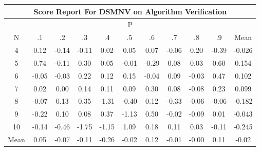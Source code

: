 \documentclass[11pt,a4paper]{report}
\begin{document}
\begin{longtable}{ | c || c | c | c | c | c | c | c | c | c || c |}
\hline
\multicolumn{11}{|c|}{ Score Report For DSMNV on Algorithm Verification} \\
\hline
\multicolumn{11}{|c|}{ P } \\
\hline
N & .1 & .2 & .3 & .4 & .5 & .6 & .7 & .8 & .9 & Mean\\
 \hline
 \hline
 \endhead
  4 &  \cellcolor[HTML]{FFFFFF} 0.12 &  \cellcolor[HTML]{FFFFFF} -0.14 &  \cellcolor[HTML]{FFFFFF} -0.11 &  \cellcolor[HTML]{FFFFFF} 0.02 &  \cellcolor[HTML]{FFFFFF} 0.05 &  \cellcolor[HTML]{FFFFFF} 0.07 &  \cellcolor[HTML]{FFFFFF} -0.06 &  \cellcolor[HTML]{F7F7FF} 0.20 &  \cellcolor[HTML]{FFF7F7} -0.39 & -0.026 \\
  5 &  \cellcolor[HTML]{EFEFFF} 0.74 &  \cellcolor[HTML]{FFFFFF} -0.11 &  \cellcolor[HTML]{F7F7FF} 0.30 &  \cellcolor[HTML]{FFFFFF} 0.05 &  \cellcolor[HTML]{FFFFFF} -0.01 &  \cellcolor[HTML]{FFF7F7} -0.29 &  \cellcolor[HTML]{FFFFFF} 0.08 &  \cellcolor[HTML]{FFFFFF} 0.03 &  \cellcolor[HTML]{EFEFFF} 0.60 & 0.154 \\
  6 &  \cellcolor[HTML]{FFFFFF} -0.05 &  \cellcolor[HTML]{FFFFFF} -0.03 &  \cellcolor[HTML]{F7F7FF} 0.22 &  \cellcolor[HTML]{FFFFFF} 0.12 &  \cellcolor[HTML]{FFFFFF} 0.15 &  \cellcolor[HTML]{FFFFFF} -0.04 &  \cellcolor[HTML]{FFFFFF} 0.09 &  \cellcolor[HTML]{FFFFFF} -0.03 &  \cellcolor[HTML]{F7F7FF} 0.47 & 0.102 \\
  7 &  \cellcolor[HTML]{FFFFFF} 0.02 &  \cellcolor[HTML]{FFFFFF} 0.00 &  \cellcolor[HTML]{FFFFFF} 0.14 &  \cellcolor[HTML]{FFFFFF} 0.11 &  \cellcolor[HTML]{FFFFFF} 0.09 &  \cellcolor[HTML]{F7F7FF} 0.30 &  \cellcolor[HTML]{FFFFFF} 0.08 &  \cellcolor[HTML]{FFFFFF} -0.08 &  \cellcolor[HTML]{F7F7FF} 0.23 & 0.099 \\
  8 &  \cellcolor[HTML]{FFFFFF} -0.07 &  \cellcolor[HTML]{FFFFFF} 0.13 &  \cellcolor[HTML]{F7F7FF} 0.35 &  \cellcolor[HTML]{FFDFDF} -1.31 &  \cellcolor[HTML]{FFF7F7} -0.40 &  \cellcolor[HTML]{FFFFFF} 0.12 &  \cellcolor[HTML]{FFF7F7} -0.33 &  \cellcolor[HTML]{FFFFFF} -0.06 &  \cellcolor[HTML]{FFFFFF} -0.06 & -0.182 \\
  9 &  \cellcolor[HTML]{FFF7F7} -0.22 &  \cellcolor[HTML]{FFFFFF} 0.10 &  \cellcolor[HTML]{FFFFFF} 0.08 &  \cellcolor[HTML]{F7F7FF} 0.37 &  \cellcolor[HTML]{FFDFDF} -1.13 &  \cellcolor[HTML]{EFEFFF} 0.50 &  \cellcolor[HTML]{FFFFFF} -0.02 &  \cellcolor[HTML]{FFFFFF} -0.09 &  \cellcolor[HTML]{FFFFFF} 0.01 & -0.043 \\
  10 &  \cellcolor[HTML]{FFFFFF} -0.14 &  \cellcolor[HTML]{FFF7F7} -0.46 &  \cellcolor[HTML]{FFCFCF} -1.75 &  \cellcolor[HTML]{FFDFDF} -1.15 &  \cellcolor[HTML]{E7E7FF} 1.09 &  \cellcolor[HTML]{F7F7FF} 0.18 &  \cellcolor[HTML]{FFFFFF} 0.11 &  \cellcolor[HTML]{FFFFFF} 0.03 &  \cellcolor[HTML]{FFFFFF} -0.11 & -0.245 \\
 \hline
 \hline
Mean &  \cellcolor[HTML]{FFFFFF} 0.05 &  \cellcolor[HTML]{FFFFFF} -0.07 &  \cellcolor[HTML]{FFFFFF} -0.11 &  \cellcolor[HTML]{FFF7F7} -0.26 &  \cellcolor[HTML]{FFFFFF} -0.02 &  \cellcolor[HTML]{FFFFFF} 0.12 &  \cellcolor[HTML]{FFFFFF} -0.01 &  \cellcolor[HTML]{FFFFFF} -0.00 &  \cellcolor[HTML]{FFFFFF} 0.11 &  \cellcolor[HTML]{FFFFFF} -0.02
\end{longtable}
\end{document}
